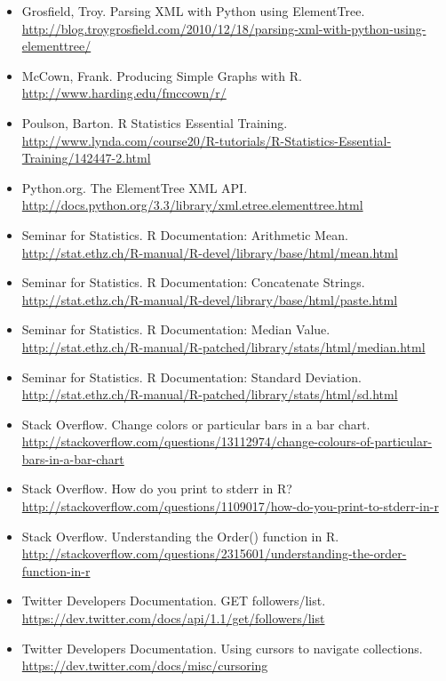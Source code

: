 \documentclass{article}
\begin{document}
\begin{itemize}
\item Grosfield, Troy. Parsing XML with Python using ElementTree. \url{http://blog.troygrosfield.com/2010/12/18/parsing-xml-with-python-using-elementtree/}
\item McCown, Frank. Producing Simple Graphs with R. \url{http://www.harding.edu/fmccown/r/}
\item Poulson, Barton. R Statistics Essential Training. \url{http://www.lynda.com/course20/R-tutorials/R-Statistics-Essential-Training/142447-2.html}
\item Python.org. The ElementTree XML API. \url{http://docs.python.org/3.3/library/xml.etree.elementtree.html}
\item Seminar for Statistics. R Documentation: Arithmetic Mean. \url{http://stat.ethz.ch/R-manual/R-devel/library/base/html/mean.html}
\item Seminar for Statistics. R Documentation: Concatenate Strings. \url{http://stat.ethz.ch/R-manual/R-devel/library/base/html/paste.html}
\item Seminar for Statistics. R Documentation: Median Value. \url{http://stat.ethz.ch/R-manual/R-patched/library/stats/html/median.html}
\item Seminar for Statistics. R Documentation: Standard Deviation. \url{http://stat.ethz.ch/R-manual/R-patched/library/stats/html/sd.html}
\item Stack Overflow. Change colors or particular bars in a bar chart. \url{http://stackoverflow.com/questions/13112974/change-colours-of-particular-bars-in-a-bar-chart}
\item Stack Overflow. How do you print to stderr in R? \url{http://stackoverflow.com/questions/1109017/how-do-you-print-to-stderr-in-r}
\item Stack Overflow. Understanding the Order() function in R. \url{http://stackoverflow.com/questions/2315601/understanding-the-order-function-in-r}
\item Twitter Developers Documentation. GET followers/list. \url{https://dev.twitter.com/docs/api/1.1/get/followers/list}
\item Twitter Developers Documentation. Using cursors to navigate collections. \url{https://dev.twitter.com/docs/misc/cursoring}
\end{itemize}
\end{document}
